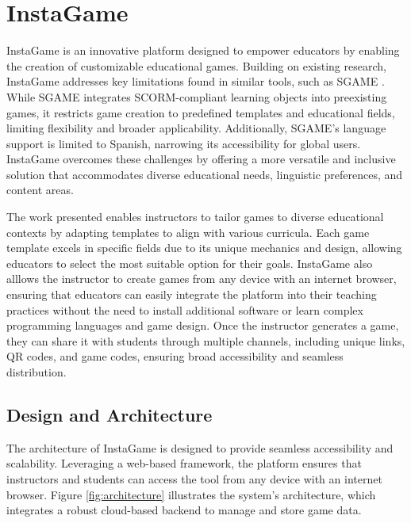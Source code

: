 \chapter{InstaGame}\label{chap:method}


InstaGame is an innovative platform designed to empower educators by enabling the creation of customizable educational games. Building on existing research, InstaGame addresses key limitations found in similar tools, such as SGAME \cite{sgame2020}. While SGAME integrates SCORM-compliant learning objects into preexisting games, it restricts game creation to predefined templates and educational fields, limiting flexibility and broader applicability. Additionally, SGAME's language support is limited to Spanish, narrowing its accessibility for global users. InstaGame overcomes these challenges by offering a more versatile and inclusive solution that accommodates diverse educational needs, linguistic preferences, and content areas.

The work presented enables instructors to tailor games to diverse educational contexts by adapting templates to align with various curricula. Each game template excels in specific fields due to its unique mechanics and design, allowing educators to select the most suitable option for their goals. InstaGame also alllows the instructor to create games from any device with an internet browser, ensuring that educators can easily integrate the platform into their teaching practices without the need to install additional software or learn complex programming languages and game design. Once the instructor generates a game, they can share it with students through multiple channels, including unique links, QR codes, and game codes, ensuring broad accessibility and seamless distribution.

\section{Design and Architecture}

The architecture of InstaGame is designed to provide seamless accessibility and scalability. Leveraging a web-based framework, the platform ensures that instructors and students can access the tool from any device with an internet browser. Figure \ref{fig:architecture} illustrates the system’s architecture, which integrates a robust cloud-based backend to manage and store game data.


